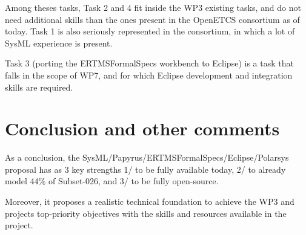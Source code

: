 Among theses tasks, Task 2 and 4 fit inside the WP3 existing tasks, and do not need additional skills than the ones present in the OpenETCS consortium as of today. Task 1 is also seriously represented in the consortium, in which a lot of SysML experience is present. 

Task 3 (porting the ERTMSFormalSpecs workbench to Eclipse) is a task that falls in the scope of WP7, and for which Eclipse development and integration skills are required.

\section{Conclusion and other comments}

As a conclusion, the SysML/Papyrus/ERTMSFormalSpecs/Eclipse/Polarsys proposal has as 3 key strengths 1/ to be fully available today, 2/ to already model 44\% of Subset-026, and 3/ to be fully open-source. 

Moreover, it proposes a realistic technical foundation to achieve the WP3 and projects top-priority objectives with the skills and resources available in the project.
